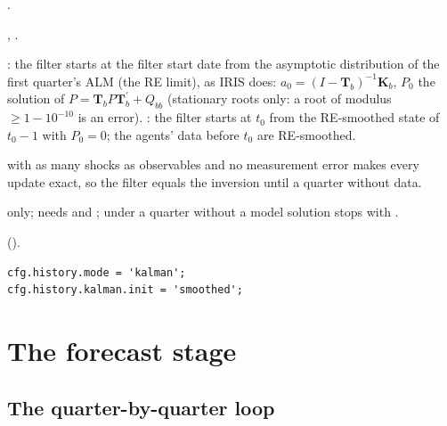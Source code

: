 \documentclass[11pt,a4paper]{article}
\DeclareRobustCommand{\codem}[1]{\texttt{\detokenize{#1}}}
\newenvironment{optspec}%
  {\begin{description}[style=sameline,leftmargin=2.7cm,labelwidth=2.5cm,font=\normalfont\itshape]}%
  {\end{description}}
\newcommand{\T}{\mathbf{T}}
\newcommand{\K}{\mathbf{K}}
\newcommand{\transp}{^{\prime}}
\begin{document}
\subsubsection{\texorpdfstring{\codem{history.kalman.init}}{history.kalman.init}}\label{opt:history-kalman-init}
\begin{optspec}
  \item[Default] .
  \item[Values] , .
  \item[Math] : the filter starts at the filter start date from the asymptotic
        distribution of the first quarter's ALM (the RE limit), as IRIS  does:
        $a_0 = (I - \T_b)^{-1}\K_b$, $P_0$ the solution of $P = \T_b P \T_b\transp + Q_{bb}$
        (stationary roots only: a root of modulus $\ge 1-10^{-10}$ is an error).
        : the filter starts at $t_0$ from the RE-smoothed state of $t_0-1$ with
        $P_0 = 0$; the agents' data before $t_0$ are RE-smoothed.
  \item[Assumptions]  with as many shocks as observables and no measurement error
        makes every update exact, so the filter equals the inversion until a quarter without data.
  \item[Interactions]  only; needs  and
        ; under  a quarter
        without a model solution stops with .
  \item[Code]  ().
  \item[Example]
\begin{lstlisting}
cfg.history.mode = 'kalman';
cfg.history.kalman.init = 'smoothed';
\end{lstlisting}
\end{optspec}

\section{The forecast stage}\label{sec:forecast}

\subsection{The quarter-by-quarter loop}\label{sec:forecastloop}
\end{document}
